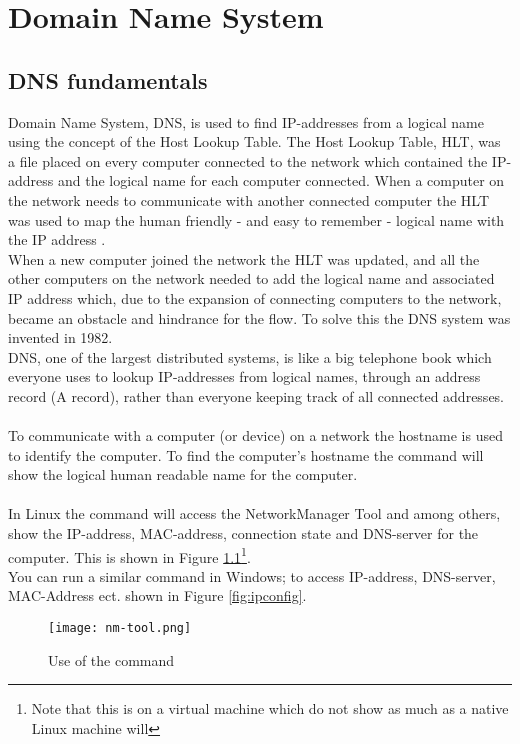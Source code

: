 \documentclass[Main]{subfiles}
\begin{document}
\chapter{Domain Name System}

\section{DNS fundamentals}
Domain Name System, DNS, is used to find IP-addresses from a logical name using the concept of the Host Lookup Table.
The Host Lookup Table, HLT, was a file placed on every computer connected to the network which contained the IP-address and the logical name for each computer connected. When a computer on the network needs to communicate with another connected computer the HLT was used to map the human friendly - and easy to remember - logical name with the IP address \cite[History section]{wiki-hosts}.
\\When a new computer joined the network the HLT was updated, and all the other computers on the network needed to add the logical name and associated IP address which, due to the expansion of connecting computers to the network, became an obstacle and hindrance for the flow. To solve this the DNS system was invented in 1982\cite[History section]{wiki-dns}.
\\DNS, one of the largest distributed systems, is like a big telephone book which everyone uses to lookup IP-addresses from logical names, through an address record (A record)\cite[p. 209-210]{Tanenbaum}, rather than everyone keeping track of all connected addresses.
\\
\\
To communicate with a computer (or device) on a network the hostname is used to identify the computer. To find the computer's hostname the command  will show the logical human readable name for the computer. 
\\
\\
In Linux the command  will access the NetworkManager Tool and among others, show the IP-address, MAC-address, connection state and DNS-server for the computer.
This is shown in Figure \ref{fig:nm-tool}\footnote{Note that this is on a virtual machine which do not show as much as a native Linux machine will}.
\\
You can run a similar command in Windows;  to access IP-address, DNS-server, MAC-Address ect. shown in Figure \ref{fig:ipconfig}.


\begin{figure}[H]
\centering
\texttt{[image: nm-tool.png]}
\caption{Use of the command }
\label{fig:nm-tool}
\end{figure}
\end{document}
